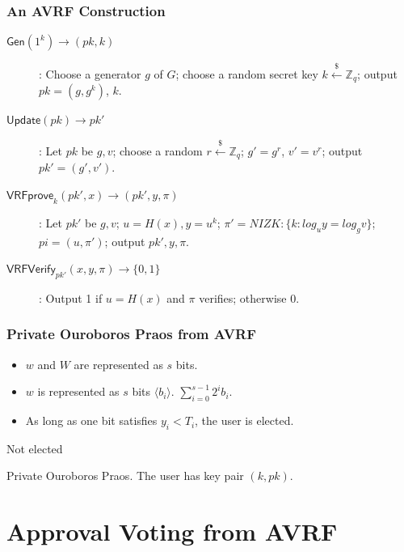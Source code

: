 \documentclass{beamer}
\begin{document}
\begin{frame}
\frametitle{An AVRF Construction}

\begin{description}
    \item[$\mathsf{Gen}(1^k) \to (pk, k)$]: Choose a generator $g$ of $G$; choose a random secret key $k \stackrel{\$}{\gets} \mathbb{Z}_q$; output $pk = (g, g^k)$, $k$.
    \item[$\mathsf{Update}(pk) \to pk'$]: Let $pk$ be $g, v$; choose a random $r \stackrel{\$}{\gets} \mathbb{Z}_q$; $g' = g^r$, $v' = v^r$; output $pk' = (g', v')$.
    \item[$\mathsf{VRFprove}_k(pk', x) \to (pk', y, \pi)$]: Let $pk'$ be $g, v$; $u = H(x), y = u^k$; $\pi' = NIZK: \{k: log_uy = log_gv\}$; $pi = (u, \pi')$; output $pk', y, \pi$.
    \item[$\mathsf{VRFVerify}_{pk'}(x, y, \pi) \to \{0, 1\}$]: Output 1 if $u = H(x)$ and $\pi$ verifies; otherwise 0.
\end{description}

\end{frame}


\begin{frame}
\frametitle{Private Ouroboros Praos from AVRF}

\begin{itemize}
    \item $w$ and $W$ are represented as $s$ bits.
    \item $w$ is represented as $s$ bits $\langle b_i \rangle$. $\sum_{i=0}^{s-1} 2^i b_i$.
    \item As long as one bit satisfies $y_i < T_i$, the user is elected.
\end{itemize}

\begin{algorithm}[H]
    \DontPrintSemicolon
    Not elected\;
    \caption{Private Ouroboros Praos. The user has key pair $(k, pk)$.}
\end{algorithm}

\end{frame}




\section{Approval Voting from AVRF}
\end{document}
